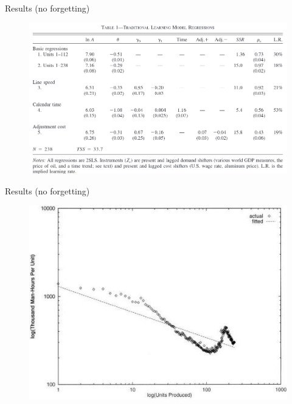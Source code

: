 \documentclass[dvipsnames]{beamer}
\begin{document}
%
\begin{frame}{Results (no forgetting)}
  \begin{figure}[htp]
    \centering
    \includegraphics[width=\textwidth, keepaspectratio=true]{table1.png}
  \end{figure}
\end{frame}
%
\begin{frame}{Results (no forgetting)}
  \begin{figure}[htp]
    \centering
    \includegraphics[width=\textwidth, keepaspectratio=true]{fig3.jpg}
  \end{figure}
\end{frame}
%
\end{document}
